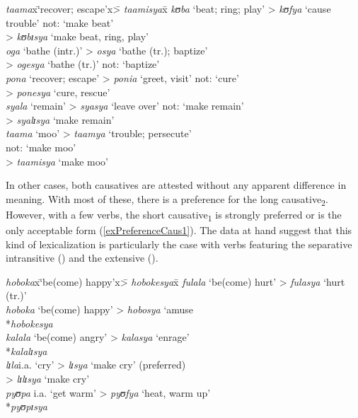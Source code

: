 \begin{exe}
\ex \label{exShortCausativeLexicalized}
\begin{tabbing}
\textit{taama}x\=\lq recover; escape'x\= > \textit{taamisya}x\=\kill %
\textit{kʊba} \> \lq beat; ring; play' \> > \textit{kʊfya} \> \lq cause trouble' not: \lq make beat'\\
\> \> > \textit{kʊbɪsya} \> \lq make beat, ring, play'\\
\textit{oga} \> \lq bathe (intr.)' \> > \textit{osya} \> \lq bathe (tr.); baptize'\\
\> \> > \textit{ogesya} \> \lq bathe (tr.)' not: \lq baptize'\\
\textit{pona} \> \lq recover; escape' \> > \textit{ponia} \> \lq greet, visit' not: \lq cure'\\
\> \> > \textit{ponesya} \> \lq cure, rescue'\\
\textit{syala} \> \lq remain' \> > \textit{syasya} \> \lq leave over' not: \lq make remain'\\
\> \> > \textit{syalɪsya} \> \lq make remain'\\
\textit{taama} \> \lq moo' \> > \textit{taamya} \> \lq trouble; persecute'\\
\>\>\>not: \lq make moo'\\
\> \> > \textit{taamisya} \> \lq make moo'
\end{tabbing}
\end{exe}

In other cases, both causatives are attested without any apparent difference in meaning. With most of these, there is a preference for the long causative\textsubscript{2}. However, with a few verbs, the short causative\textsubscript{1} is strongly preferred or is the only acceptable form (\ref{exPreferenceCaus1}). The data at hand suggest that this kind of lexicalization is particularly the case with verbs featuring the separative intransitive () and the extensive ().

\begin{exe}
\ex \label{exPreferenceCaus1}\begin{tabbing}
\textit{hoboka}x\=\lq be(come) happy'x\= > \textit{hobokesya}x\=\kill %
\textit{fulala}\> \lq be(come) hurt'\> > \textit{fulasya} \> \lq hurt (tr.)'\\
\textit{hoboka}\> \lq be(come) happy'\> > \textit{hobosya} \> \lq amuse\\
\> \> \hphantom{> }*\textit{hobokesya}\\
\textit{kalala}\> `be(come) angry' \> > \textit{kalasya} \> \lq enrage'\\
\> \> \hphantom{> }*\textit{kalalɪsya}\\
\textit{lɪla}\>i.a. \lq cry' \> > \textit{lɪsya} \> \lq make cry' (preferred)\\
\> \> > \textit{lɪlɪsya} \> \lq make cry'\\
\textit{pyʊpa}\> i.a. \lq get warm' \> > \textit{pyʊfya} \> \lq heat, warm up'\\
\> \> \hphantom{> }*\textit{pyʊpɪsya}
\end{tabbing} 
\end{exe}

